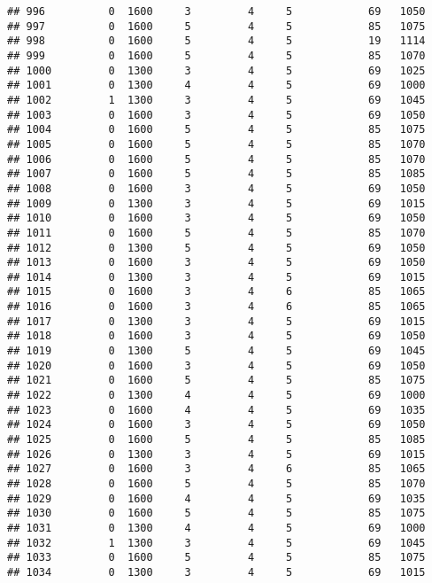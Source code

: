 \documentclass[]{article}
\begin{document}
\begin{verbatim}
## 996          0  1600     3         4     5            69   1050
## 997          0  1600     5         4     5            85   1075
## 998          0  1600     5         4     5            19   1114
## 999          0  1600     5         4     5            85   1070
## 1000         0  1300     3         4     5            69   1025
## 1001         0  1300     4         4     5            69   1000
## 1002         1  1300     3         4     5            69   1045
## 1003         0  1600     3         4     5            69   1050
## 1004         0  1600     5         4     5            85   1075
## 1005         0  1600     5         4     5            85   1070
## 1006         0  1600     5         4     5            85   1070
## 1007         0  1600     5         4     5            85   1085
## 1008         0  1600     3         4     5            69   1050
## 1009         0  1300     3         4     5            69   1015
## 1010         0  1600     3         4     5            69   1050
## 1011         0  1600     5         4     5            85   1070
## 1012         0  1300     5         4     5            69   1050
## 1013         0  1600     3         4     5            69   1050
## 1014         0  1300     3         4     5            69   1015
## 1015         0  1600     3         4     6            85   1065
## 1016         0  1600     3         4     6            85   1065
## 1017         0  1300     3         4     5            69   1015
## 1018         0  1600     3         4     5            69   1050
## 1019         0  1300     5         4     5            69   1045
## 1020         0  1600     3         4     5            69   1050
## 1021         0  1600     5         4     5            85   1075
## 1022         0  1300     4         4     5            69   1000
## 1023         0  1600     4         4     5            69   1035
## 1024         0  1600     3         4     5            69   1050
## 1025         0  1600     5         4     5            85   1085
## 1026         0  1300     3         4     5            69   1015
## 1027         0  1600     3         4     6            85   1065
## 1028         0  1600     5         4     5            85   1070
## 1029         0  1600     4         4     5            69   1035
## 1030         0  1600     5         4     5            85   1075
## 1031         0  1300     4         4     5            69   1000
## 1032         1  1300     3         4     5            69   1045
## 1033         0  1600     5         4     5            85   1075
## 1034         0  1300     3         4     5            69   1015

\end{verbatim}
\end{document}
